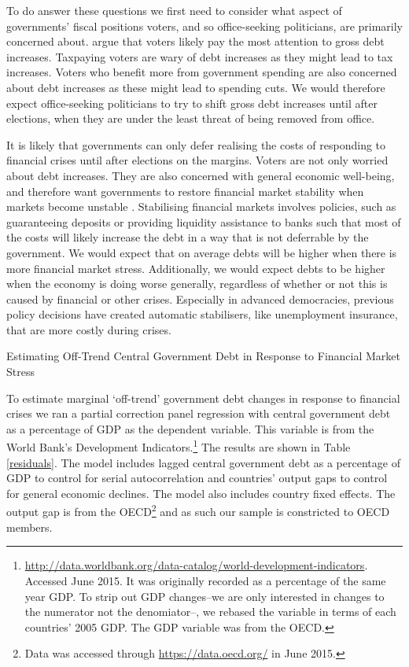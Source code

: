 \documentclass[]{article}
\begin{document}
To do answer these questions we first need to consider what aspect of governments' fiscal positions voters, and so office-seeking politicians, are primarily concerned about. \cite{gandrudHallerbergWEP} argue that voters likely pay the most attention to gross debt increases. Taxpaying voters are wary of debt increases as they might lead to tax increases. Voters who benefit more from government spending are also concerned about debt increases as these might lead to spending cuts. We would therefore expect office-seeking politicians to try to shift gross debt increases until after elections, when they are under the least threat of being removed from office.

It is likely that governments can only defer realising the costs of responding to financial crises until after elections on the margins. Voters are not only worried about debt increases. They are also concerned with general economic well-being, and therefore want governments to restore financial market stability when markets become unstable \citep{Rosas2009}. Stabilising financial markets involves policies, such as guaranteeing deposits or providing liquidity assistance to banks such that most of the costs will likely increase the debt in a way that is not deferrable by the government. We would expect that on average debts will be higher when there is more financial market stress. Additionally, we would expect debts to be higher when the economy is doing worse generally, regardless of whether or not this is caused by financial or other crises. Especially in advanced democracies, previous policy decisions have created automatic stabilisers, like unemployment insurance, that are more costly during crises.

\begin{table}
    \caption{Estimating Off-Trend Central Government Debt in Response to Financial Market Stress}
    \label{residuals}
        \begin{center}
            
        \end{center}
\end{table}

To estimate marginal `off-trend' government debt changes in response to financial crises we ran a partial correction panel regression with central government debt as a percentage of GDP as the dependent variable. This variable is from the World Bank's Development Indicators.\footnote{\url{http://data.worldbank.org/data-catalog/world-development-indicators}. Accessed June 2015. It was originally recorded as a percentage of the same year GDP. To strip out GDP changes--we are only interested in changes to the numerator not the denomiator--, we rebased the variable in terms of each countries' 2005 GDP. The GDP variable was from the OECD.} The results are shown in Table \ref{residuals}. The model includes lagged central government debt as a percentage of GDP to control for serial autocorrelation and countries' output gaps to control for general economic declines. The model also includes country fixed effects. The output gap is from the OECD\footnote{Data was accessed through \url{https://data.oecd.org/} in June 2015.} and as such our sample is constricted to OECD members.
\end{document}
